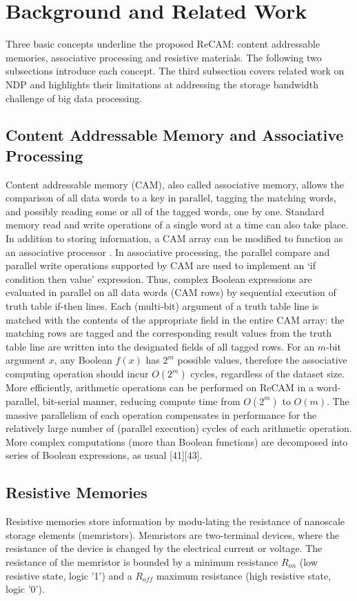 \documentclass{superfri}
\begin{document}
\section{Background and Related Work}
\label{sec:backgroud}
Three basic concepts underline the proposed ReCAM: content addressable memories, associative processing and resistive materials. The following two subsections introduce each concept. The third subsection covers related work on NDP and highlights their limitations at addressing the storage bandwidth challenge of big data processing.

\subsection{Content Addressable Memory and Associative Processing}
\label{sec:CAMandAP}
Content addressable memory (CAM), also called associative memory, allows the comparison of all data words to a key in parallel, tagging the matching words, and possibly reading some or all of the tagged words, one by one. Standard memory read and write operations of a single word at a time can also take place.
In addition to storing information, a CAM array can be modified to function as an associative processor \cite{foster1976content}\cite{yavits2015resistive}. In associative processing, the parallel compare and parallel write operations supported by CAM are used to implement an ‘if condition then value' expression. Thus, complex Boolean expressions are evaluated in parallel on all data words (CAM rows) by sequential execution of truth table if-then lines. Each (multi-bit) argument of a truth table line is matched with the contents of the appropriate field in the entire CAM array: the matching rows are tagged and the corresponding result values from the truth table line are written into the designated fields of all tagged rows. 
For an $m$-bit argument $x$, any Boolean $f(x)$ has $2^m$ possible values, therefore the associative computing operation should incur $O(2^m)$ cycles, regardless of the dataset size. More efficiently, arithmetic operations can be performed on ReCAM in a word-parallel, bit-serial manner, reducing compute time from $O(2^m)$ to $O(m)$. The massive parallelism of each operation compensates in performance for the relatively large number of (parallel execution) cycles of each arithmetic operation.
More complex computations (more than Boolean functions) are decomposed into series of Boolean expressions, as usual [41][43]. 

\subsection{Resistive Memories}
\label{sec:resistive_memories}
Resistive memories store information by modu-lating the resistance of nanoscale storage elements (memristors). Memristors are two-terminal devices, where the resistance of the device is changed by the electrical current or voltage. The resistance of the memristor is bounded by a minimum resistance $R_{on}$ (low resistive state, logic '1') and a $R_{off}$ maximum resistance (high resistive state, logic '0').
\end{document}
